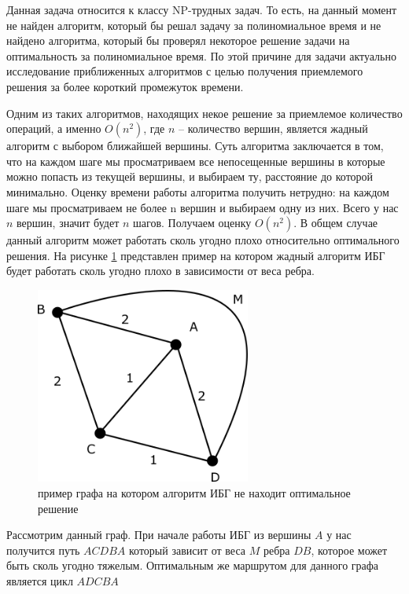\documentclass[a4paper, 14pt]{extarticle}
\numberwithin{equation}{section}
\begin{document}
Данная задача относится к классу NP-трудных задач. То есть, на данный момент не найден алгоритм, который бы решал задачу за полиномиальное время и не найдено алгоритма, который бы проверял некоторое решение задачи на оптимальность за полиномиальное время. По этой причине для задачи актуально исследование приближенных алгоритмов с целью получения приемлемого решения за более короткий промежуток времени.

Одним из таких алгоритмов, находящих некое решение за приемлемое количество операций, а именно $O(n^{2})$, где $n$ -- количество вершин, является жадный алгоритм с выбором ближайшей вершины. Суть алгоритма заключается в том, что на каждом шаге мы просматриваем все непосещенные вершины в которые можно попасть из текущей вершины, и выбираем ту, расстояние до которой минимально. Оценку времени работы алгоритма получить нетрудно: на каждом шаге мы просматриваем не более n вершин и выбираем одну из них. Всего у нас $n$ вершин, значит будет $n$ шагов. Получаем оценку $O(n^{2})$. В общем случае данный алгоритм может работать сколь угодно плохо относительно оптимального решения. На рисунке \ref{fig:examplenoibg} представлен пример на котором жадный алгоритм ИБГ будет работать сколь угодно плохо в зависимости от веса ребра.

\begin{figure}[h!]
\begin{center}
\includegraphics[width=200pt]{ris_example.png}
\caption{пример графа на котором алгоритм ИБГ не находит оптимальное решение}
\label{fig:examplenoibg}
\end{center}
\end{figure}

Рассмотрим данный граф. При начале работы ИБГ из вершины $A$ у нас получится путь $ACDBA$ который зависит от веса $M$ ребра $DB$, которое может быть сколь угодно тяжелым. Оптимальным же маршрутом для данного графа является цикл $ADCBA$
\end{document}
